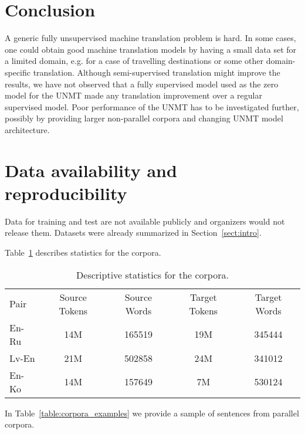 \documentclass[]{article}
\begin{document}

\section{Conclusion}

A generic fully unsupervised machine translation problem is hard.
In some cases, one could obtain good machine translation models by having a small data set for a limited domain, e.g. for a case of travelling destinations or some other domain-specific translation.
Although semi-supervised translation might improve the results, we have not observed that a fully supervised model used as the zero model for the UNMT made any translation improvement over a regular supervised model.
Poor performance of the UNMT has to be investigated further, possibly by providing larger non-parallel corpora and changing UNMT model architecture.

\section{Data availability and reproducibility}
\label{sect:data}

Data for training and test are not available publicly and organizers would not release them.
Datasets were already summarized in Section~\ref{sect:intro}.

Table~\ref{table:corpora_stats} describes statistics for the corpora.

\begin{table}[h!]
\begin{center}
\begin{tabular}{ l c c c c }
Pair & Source Tokens & Source Words & Target Tokens & Target Words \\
En-Ru & 14M & 165519 & 19M & 345444 \\
Lv-En & 21M & 502858 & 24M & 341012 \\
En-Ko & 14M & 157649 & 7M & 530124 \\
\end{tabular}
\end{center}
\caption{Descriptive statistics for the corpora.}
\label{table:corpora_stats}
\end{table}

In Table~\ref{table:corpora_examples} we provide a sample of sentences from parallel corpora.
\end{document}
